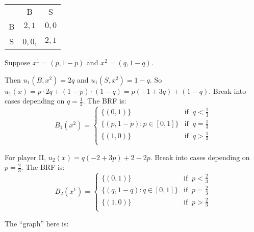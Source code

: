 \documentclass[12pt,letterpaper]{report}
\begin{document}
\pagebreak
\begin{ex}
  \begin{center}
    \renewcommand{\arraystretch}{1.25}
    \begin{tabular}{c |c|c|}
      \multicolumn{1}{c}{} & \multicolumn{1}{c}{B} & \multicolumn{1}{c}{S} \\
      \cline{2-3}
      B & $2, 1$ & $0, 0$ \\
      \cline{2-3}
      S & $0, 0$, & $2, 1$ \\
      \cline{2-3}
    \end{tabular}
  \end{center}

  Suppose $x^1 = (p, 1 - p)$ and $x^2 = (q, 1 - q)$.

  Then $u_1(B, x^2) = 2q$ and $u_1(S, x^2) = 1 - q$.
  So $u_1(x) = p \cdot 2q + (1 - p) \cdot (1 - q) = p(-1 + 3q) + (1 - q)$.
  Break into cases depending on $q = \frac{1}{3}$.
  The BRF is:
  \[
    B_1(x^2) = \begin{cases}
      \{ (0, 1) \} & \text{if } \ q < \frac{1}{3} \\
      \{ (p, 1 - p) : p \in [0, 1] \} & \text{if } \ q = \frac{1}{3} \\
      \{ (1, 0) \} & \text{if } \ q > \frac{1}{3} \\
    \end{cases}
  \]

  For player II, $u_2(x) = q(-2 + 3p) + 2 - 2p$.
  Break into cases depending on $p = \frac{2}{3}$.
  The BRF is:
  \[
    B_2(x^1) = \begin{cases}
      \{ (0, 1) \} & \text{if } \ p < \frac{2}{3} \\
      \{ (q, 1 - q) : q \in [0, 1] \} & \text{if } \ p = \frac{2}{3} \\
      \{ (1, 0) \} & \text{if } \ p > \frac{2}{3} \\
    \end{cases}
  \]

  The ``graph'' here is:
  \begin{center}
\end{center}
\end{ex}
\end{document}
